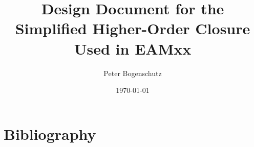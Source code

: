 \documentclass[12pt]{article}
\title{Design Document for the Simplified Higher-Order Closure Used in EAMxx}
\author[1]{Peter Bogenschutz}
\date{\today}
\affil[1]{Lawrence Livermore National Lab, Livermore CA}
\begin{document}
\maketitle{}



\section{Bibliography}

\end{document}
